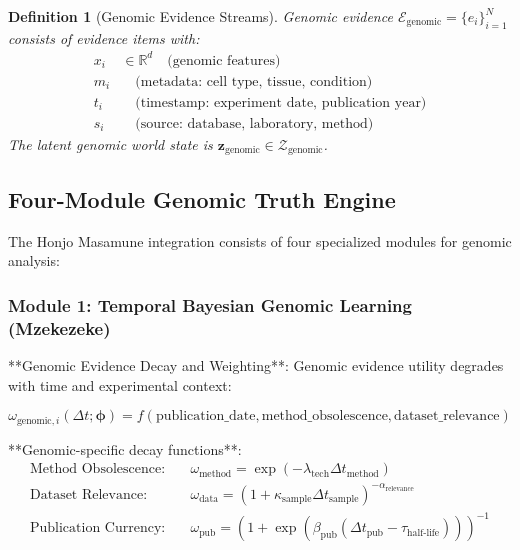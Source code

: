 \documentclass[12pt,a4paper]{article}
\newtheorem{definition}[theorem]{Definition}
\begin{document}
\begin{definition}[Genomic Evidence Streams]
Genomic evidence $\mathcal{E}_{\text{genomic}} = \{e_i\}_{i=1}^{N}$ consists of evidence items with:
\begin{align}
x_i &\in \mathbb{R}^{d} \quad \text{(genomic features)} \\
m_i &\quad \text{(metadata: cell type, tissue, condition)} \\
t_i &\quad \text{(timestamp: experiment date, publication year)} \\
s_i &\quad \text{(source: database, laboratory, method)}
\end{align}
The latent genomic world state is $\mathbf{z}_{\text{genomic}} \in \mathcal{Z}_{\text{genomic}}$.
\end{definition}

\subsection{Four-Module Genomic Truth Engine}

The Honjo Masamune integration consists of four specialized modules for genomic analysis:

\subsubsection{Module 1: Temporal Bayesian Genomic Learning (Mzekezeke)}

**Genomic Evidence Decay and Weighting**: Genomic evidence utility degrades with time and experimental context:

\begin{equation}
\omega_{\text{genomic},i}(\Delta t; \bm{\phi}) = f(\text{publication\_date}, \text{method\_obsolescence}, \text{dataset\_relevance})
\end{equation}

**Genomic-specific decay functions**:
\begin{align}
\text{Method Obsolescence:} \quad & \omega_{\text{method}} = \exp(-\lambda_{\text{tech}} \Delta t_{\text{method}}) \\
\text{Dataset Relevance:} \quad & \omega_{\text{data}} = (1 + \kappa_{\text{sample}} \Delta t_{\text{sample}})^{-\alpha_{\text{relevance}}} \\
\text{Publication Currency:} \quad & \omega_{\text{pub}} = (1 + \exp(\beta_{\text{pub}}(\Delta t_{\text{pub}} - \tau_{\text{half-life}})))^{-1}
\end{align}
\end{document}
